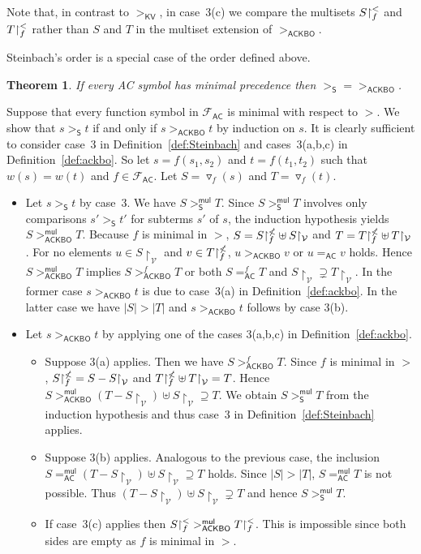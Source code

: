 \documentclass{tlp}
\newcommand{\qed}{\hspace*{1em}\hbox{\proofbox}}
\newtheorem{theorem}{Theorem}[section]
\newcommand{\tf}[1]{{\triangledown_{\!#1}}}
\newcommand{\m}[1]{\mathsf{#1}}
\newcommand{\mc}[1]{\mathcal{#1}}
\newcommand{\mr}[1]{\mathrm{#1}}
\newcommand{\mul}{\m{mul}}
\newcommand{\FF}{\mc{F}}
\newcommand{\VV}{\mc{V}}
\newcommand{\AC}{\mr{\m{AC}}}
\newcommand{\ackbo}{\mr{\m{ACKBO}}}
\newcommand{\steinbach}{\mr{\m{S}}}
\newcommand{\KV}{\mr{\m{KV}}}
\newcommand{\rrs}[3][f]{{#2}{\restriction}^{\smash{#3}}_{#1}}
\begin{document}
Note that, in contrast to $>_\KV$, in case~3(c) we compare the multisets
$\rrs{S}{<}$ and $\rrs{T}{<}$ rather than
$S$ and $T$ in the multiset extension of $>_\ackbo$.


Steinbach's order is a special case of the order defined above.

\begin{theorem}
\label{S vs ACKBO}
If every AC symbol has minimal precedence then
${>_\steinbach} = {>_\ackbo}$.
\end{theorem}
\begin{proof*}
Suppose that
every function symbol in $\FF_\AC$ is minimal with respect to $>$.
We show that $s >_\steinbach t$ if and only if $s >_\ackbo t$
by induction on $s$. It is clearly sufficient to consider 
case~3 in Definition~\ref{def:Steinbach}
and cases~3(a,b,c) in Definition~\ref{def:ackbo}.
So let $s = f(s_1,s_2)$ and $t = f(t_1,t_2)$ such that
$w(s) = w(t)$ and $f \in \FF_\AC$.
Let $S = \tf{f}(s)$ and $T = \tf{f}(t)$.
\begin{itemize}
\item
Let $s >_\steinbach t$ by case~3.
We have $S >_\steinbach^\mul T$.
Since $S >_\steinbach^\mul T$ involves only comparisons
$s' >_\steinbach t'$ for subterms $s'$ of $s$,
the induction hypothesis yields $S >_\ackbo^\mul T$.
Because $f$ is minimal in $>$,
$S = \rrs{S}{\nless} \uplus S{\restriction_\VV}$
and $T = \rrs{T}{\nless} \uplus T{\restriction_\VV}$. 
For no elements
$u \in S{\restriction_\VV}$ and $v \in \rrs{T}{\nless}$,
$u >_\ackbo v$ or $u =_\AC v$ holds. Hence $S >_\ackbo^\mul T$
implies $S >_\ackbo^f T$ or both $S =_\AC^f T$
and
$S{\restriction_\VV} \supsetneq T{\restriction_\VV}$.
In the former case $s >_\ackbo t$
is due to case~3(a) in Definition~\ref{def:ackbo}. In the latter case
we have $|S| > |T|$ and $s >_\ackbo t$ follows by case 3(b).
\smallskip
\item
Let $s >_\ackbo t$ by applying one of the cases 3(a,b,c) in
Definition~\ref{def:ackbo}.
\begin{itemize}
\item
Suppose 3(a) applies. Then we have $S >_\ackbo^f T$.
Since $f$ is minimal in $>$,
$\rrs{S}{\nless} = S - S{\restriction}_\VV$ and
$\rrs{T}{\nless} \uplus T{\restriction}_\VV = T$.
Hence $S >_\ackbo^\mul (T - S{\restriction}_\VV) \uplus
S{\restriction}_\VV \supseteq T$. We obtain
$S >_\steinbach^\mul T$ from the induction hypothesis and thus
case~3 in Definition~\ref{def:Steinbach} applies.
\item
Suppose 3(b) applies. Analogous to the previous case, the inclusion
$S =_\AC^\mul (T - S{\restriction}_\VV) \uplus S{\restriction}_\VV
\supseteq T$ holds.
Since $|S| > |T|$, $S =_\AC^\mul T$ is not possible. Thus
$(T - S{\restriction}_\VV) \uplus S{\restriction}_\VV \supsetneq T$ and
hence $S >_\steinbach^\mul T$.
\item
If case~3(c) applies then $\rrs{S}{<} >_\ackbo^\mul \rrs{T}{<}$.
This is impossible since both sides are empty as
$f$ is minimal in $>$.
\qed
\end{itemize}
\end{itemize}
\end{proof*}
\end{document}
